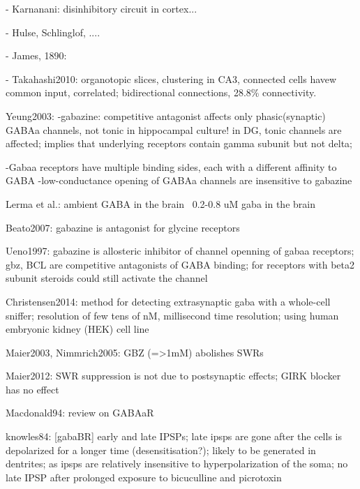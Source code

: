 - Karnanani: disinhibitory circuit in cortex...


- Hulse, Schlinglof, ....

- James, 1890: 

- Takahashi2010: organotopic slices, clustering in CA3, connected cells havew common input, correlated; bidirectional connections, 28.8\% connectivity.

Yeung2003:
  -gabazine: competitive antagonist affects only phasic(synaptic) GABAa channels, not tonic in hippocampal culture! in DG, tonic channels are affected; implies that underlying receptors contain gamma subunit but not delta;

  -Gabaa receptors have multiple binding sides, each with a different affinity to GABA
  -low-conductance opening of GABAa channels are insensitive to gabazine

Lerma et al.: ambient GABA in the brain ~0.2-0.8 uM gaba in the brain

Beato2007: gabazine is antagonist for glycine receptors

Ueno1997: gabazine is allosteric inhibitor of channel openning of gabaa receptors; gbz, BCL are competitive antagonists of GABA binding; for receptors with beta2 subunit steroids could still activate the channel

Christensen2014: method for detecting extrasynaptic gaba with a whole-cell sniffer; resolution of few tens of nM, millisecond time resolution; using human embryonic kidney (HEK) cell line

Maier2003, Nimmrich2005: GBZ (=>1mM) abolishes SWRs 

Maier2012: SWR suppression is not due to postsynaptic effects; GIRK blocker has no effect

Macdonald94: review on GABAaR

knowles84: [gabaBR] early and late IPSPs; late ipsps are gone after the cells is depolarized for a longer time (desensitisation?); likely to be generated in dentrites; as ipsps are relatively insensitive to hyperpolarization of the soma; no late IPSP after prolonged exposure to bicuculline and picrotoxin


